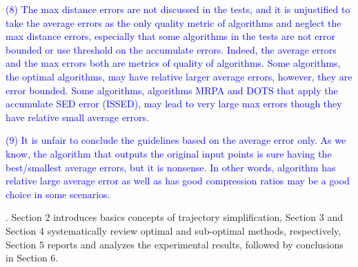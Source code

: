 {\textcolor{blue}{(8) The max distance errors are not discussed in the tests, and it is unjustified to take the average errors as the only quality metric of algorithms and neglect the max distance errors, especially that some algorithms in the tests are not error bounded or use threshold on the accumulate errors.
Indeed, the average errors and the max errors both are metrics of quality of algorithms. Some algorithms, \eg the optimal algorithms, may have relative larger average errors, however, they are error bounded. Some algorithms, \eg algorithms MRPA and DOTS that apply the accumulate SED error (ISSED), may lead to very large max errors though they have relative small average errors.}

\textcolor{blue}{(9) It is unfair to conclude the guidelines based on the average error only. As we know, the algorithm that outputs the original input points is sure having the best/smallest average errors, but it is nonsense. In other words, algorithm has relative large average error as well as has good compression ratios may be a good choice in some scenarios.}
 }%



. Section 2 introduces basics concepts of trajectory simplification,
Section 3 and Section 4 systematically review optimal and sub-optimal \lsa methods, respectively,
Section 5 reports and analyzes the experimental results, followed by
conclusions in Section 6.



